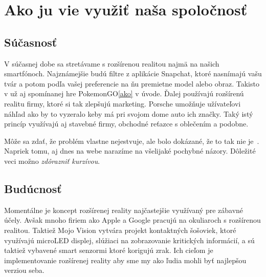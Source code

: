 \documentclass[10pt,twoside,a4paper]{article}
\begin{document}
\section{Ako ju vie využiť naša spoločnosť} \label{vyuzitie}
\subsection{Súčasnosť}\label{vyuzitie:suc}
\par V súčasnej dobe sa stretávame s rozšírenou realitou najmä na našich smartfónoch. Najznámejšie budú filtre z aplikácie Snapchat, ktoré nasnímajú vašu tvár a potom podľa vašej preferencie na ňu premietne model alebo obraz. Takisto v už aj spomínanej hre PokemonGO\ref{ako} v úvode. Ďalej používajú rozšírenú realitu firmy, ktoré si tak zlepšujú marketing. Porsche umožňuje užívateľovi náhľad ako by to vyzeralo keby má pri svojom dome auto ich značky. Taký istý princíp využívajú aj stavebné firmy, obchodné reťazce s oblečením a podobne.


Môže sa zdať, že problém vlastne nejestvuje\cite{}, ale bolo dokázané, že to tak nie je~\cite{}. Napriek tomu, aj dnes na webe narazíme na všelijaké pochybné názory\cite{}. Dôležité veci možno \emph{zdôrazniť kurzívou}.


\subsection{Budúcnosť} \label{vyuzitie:bud}

\par Momentálne je koncept rozšírenej reality najčastejšie využívaný pre zábavné účely. Avšak mnoho firiem ako Apple a Google pracujú na okuliaroch s rozšírenou realitou. Taktiež Mojo Vision vytvára projekt kontaktných šošoviek, ktoré využívajú microLED displej, slúžiaci na zobrazovanie kritických informácií, a sú taktiež vybavené smart senzormi ktoré korigujú zrak. Ich cieľom je implementovanie rozšírenej reality aby sme my ako ľudia mohli byť najlepšou verziou seba.~\cite{Mojo}
\end{document}
